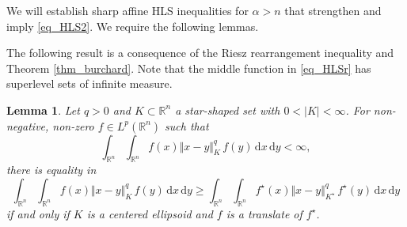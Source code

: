 \documentclass{amsart}
\newtheorem{lemma}[theorem]{Lemma}
\newcommand{\R}{\mathbb R}
\renewcommand{\d}{\,\mathrm{d}}
\newcommand{\vol}[1]{\vert #1\vert}
\begin{document}
We will establish sharp affine  HLS inequalities for $\alpha>n$ that strengthen and imply \eqref{eq_HLS2}. 
We require the following lemmas.

\goodbreak
The following result is a consequence of the Riesz rearrangement inequality and Theorem \ref{thm_burchard}. Note that the middle function in \eqref{eq_HLSr} has superlevel sets of infinite measure.

\begin{lemma}\label{lem_reverse_strict_rearrangement}
Let $q>0$ and $K\subset\R^n$ a star-shaped set with $0<\vol{K}<\infty$.
For non-negative, non-zero $f\in L^p(\R^n)$ such that
\begin{equation}\label{eq_HLSr}
\int_{\R^n}\int_{\R^n} {f(x) {\Vert x-y\Vert_K^q}\,  f(y)}\d x \d y<\infty,
\end{equation}
there is equality in
\begin{equation}\label{eq_riesz_equality}
       \int_{\R^n}\int_{\R^n} {f(x) {\Vert x-y\Vert_K^q} \,f(y)} \d x \d y \geq \int_{\R^n}\int_{\R^n} {f^\star(x) {\Vert x-y\Vert_{K^\star}^q}\, f^\star(y)} \d x \d y
\end{equation}
if and only if $K$ is a centered ellipsoid and $f$ is a translate of $f^\star$.
\end{lemma}
\end{document}
